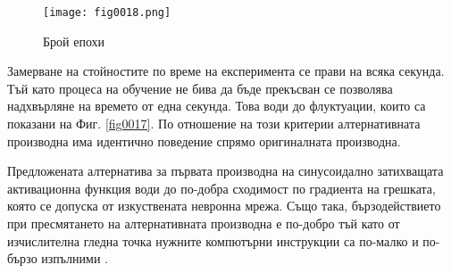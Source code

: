 \begin{figure}[H]
  \centering
  \texttt{[image: fig0018.png]}
  \caption{Брой епохи}
\label{fig0018}
\end{figure}

Замерване на стойностите по време на експеримента се прави на всяка секунда. Тъй като процеса на обучение не бива да бъде прекъсван се позволява надхвърляне на времето от една секунда. Това води до флуктуации, които са показани на Фиг. \ref{fig0017}. По отношение на този критерии алтернативната производна има идентично поведение спрямо оригиналната производна.

Предложената алтернатива за първата производна на синусоидално затихващата активационна функция води до по-добра сходимост по градиента на грешката, която се допуска от изкуствената невронна мрежа. Също така, бързодействието при пресмятането на алтернативната производна е по-добро тъй като от изчислителна гледна точка нужните компютърни инструкции са по-малко и по-бързо изпълними \cite{Zankinski-01}.

